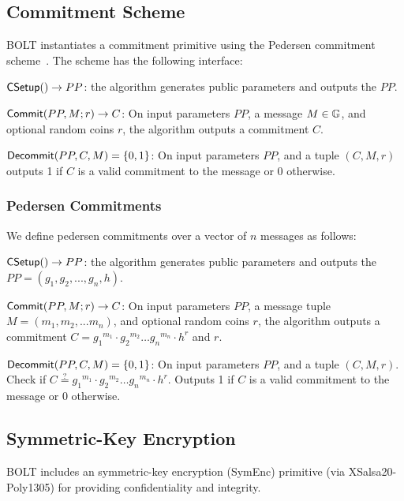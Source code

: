 \documentclass[11pt]{report}
\begin{document}

\subsection{Commitment Scheme}
\label{sec:commit}

BOLT instantiates a commitment primitive using the Pedersen commitment scheme~\cite{PedersenCommits}. The scheme has the following interface:

\medskip \noindent
${\sf CSetup}() \rightarrow PP$:  the algorithm generates public parameters and outputs the $PP$.

\medskip \noindent
${\sf Commit}(PP, M; r) \rightarrow C$: On input parameters $PP$, a message $M \in \mathbb{G}$, and optional random coins $r$, the algorithm outputs a commitment $C$. 

\medskip \noindent
${\sf Decommit}(PP, C, M) =  \{0, 1\}$: On input parameters $PP$, and a tuple $(C, M, r)$ outputs 1 if $C$ is a valid commitment to the message or 0 otherwise.

\subsubsection{Pedersen Commitments}
\label{sec:ped92}

We define pedersen commitments over a vector of $n$ messages as follows:

\medskip \noindent
${\sf CSetup}() \rightarrow PP$:  the algorithm generates public parameters and outputs the $PP = (g_1, g_2, ..., g_{n}, h)$.

\medskip \noindent
${\sf Commit}(PP, M; r) \rightarrow C$: On input parameters $PP$, a message tuple $M = (m_1, m_2, ... m_n)$, and optional random coins $r$, the algorithm outputs a commitment $C = {g_1}^{m_1} \cdot {g_2}^{m_2} \dots {g_n}^{m_n} \cdot h^r$ and $r$. 

\medskip \noindent
${\sf Decommit}(PP, C, M) =  \{0, 1\}$: On input parameters $PP$, and a tuple $(C, M, r)$. Check if $C \stackrel{?}{=} {g_1}^{m_1} \cdot {g_2}^{m_2} \dots {g_n}^{m_n} \cdot h^r$. Outputs 1 if $C$ is a valid commitment to the message or 0 otherwise. 


\subsection{Symmetric-Key Encryption}
\label{sec:authenc}

BOLT includes an symmetric-key encryption (SymEnc) primitive (via XSalsa20-Poly1305) for providing confidentiality and integrity.
\end{document}
